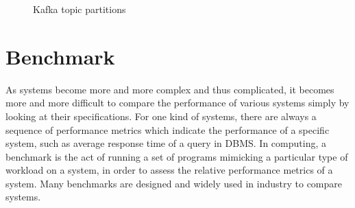 \begin{figure}
  \begin{center}
   \caption{Kafka topic partitions}
   \label{fig:kafka_partitioned_topic}
  \end{center}
\end{figure}

\section{Benchmark}
\label{section:benchmark}
As systems become more and more complex and thus complicated, it becomes more and more difficult to compare the performance of various systems simply by looking at their specifications. For one kind of systems, there are always a sequence of performance metrics which indicate the performance of a specific system, such as average response time of a query in DBMS. In computing, a benchmark is the act of running a set of programs mimicking a particular type of workload on a system, in order to assess the relative performance metrics of a system. Many benchmarks are designed and widely used in industry to compare systems.

